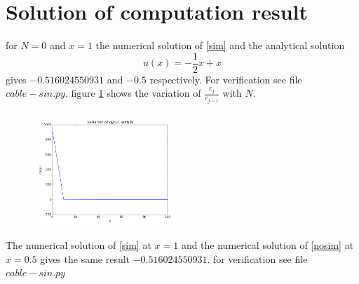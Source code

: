 \documentclass[10pt,a4paper]{report}
\begin{document}
\section{Solution of computation result}
for $N= 0$ and $x = 1$ the numerical solution of \ref{sim} and the analytical solution 
\begin{equation}
u(x) = -\frac{1}{2}x+x
\end{equation}
gives $-0.516024550931$ and $-0.5$ respectively. For verification see file $cable-sin.py$. figure \ref{fi} shows the variation of $\frac{c_{j}}{c_{j-1}}$ with $N$.
\begin{figure}[h!]\label{fi}
  \centering
    \includegraphics[width=0.5\textwidth]{p1.png}
\end{figure}
The numerical solution of \ref{sim} at $x=1$ and the numerical solution of \ref{nosim} at $x = 0.5$ gives the same result $-0.516024550931$. for verification see file $cable-sin.py$
\end{document}
